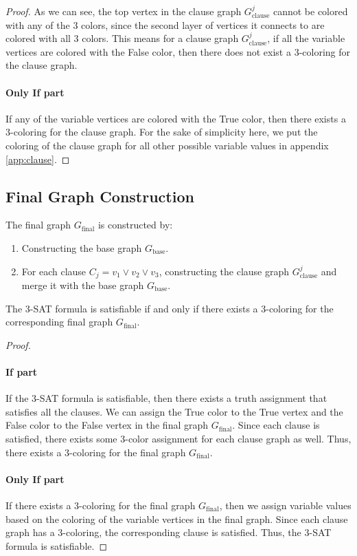 \documentclass[a4paper,12pt]{article}
\begin{document}
\begin{proof}
As we can see, the top vertex in the clause graph $G_{\text{clause}}^j$ cannot be colored with any of the 3 colors, since the second layer of vertices it connects to are colored with all 3 colors.
This means for a clause graph $G_{\text{clause}}^j$, if all the variable vertices are colored with the False color, then there does not exist a 3-coloring for the clause graph.

\paragraph{\textbf{Only If} part}

If any of the variable vertices are colored with the True color, then there exists a 3-coloring for the clause graph.
For the sake of simplicity here, we put the coloring of the clause graph for all other possible variable values in appendix \ref{app:clause}.
\end{proof}

\subsection{Final Graph Construction}

The final graph $G_{\text{final}}$ is constructed by:
\begin{enumerate}
	\item Constructing the base graph $G_{\text{base}}$.
	\item For each clause $C_j = v_1 \vee v_2 \vee v_3$, constructing the clause graph $G_{\text{clause}}^j$ and merge it with the base graph $G_{\text{base}}$.
\end{enumerate}

The 3-SAT formula is satisfiable if and only if there exists a 3-coloring for the corresponding final graph $G_{\text{final}}$.

\begin{proof}
$ $

\paragraph{\textbf{If} part}

If the 3-SAT formula is satisfiable, then there exists a truth assignment that satisfies all the clauses.
We can assign the True color to the True vertex and the False color to the False vertex in the final graph $G_{\text{final}}$.
Since each clause is satisfied, there exists some 3-color assignment for each clause graph as well.
Thus, there exists a 3-coloring for the final graph $G_{\text{final}}$.

\paragraph{\textbf{Only If} part}
If there exists a 3-coloring for the final graph $G_{\text{final}}$, then we assign variable values based on the coloring of the variable vertices in the final graph.
Since each clause graph has a 3-coloring, the corresponding clause is satisfied.
Thus, the 3-SAT formula is satisfiable.
\end{proof}
\end{document}
